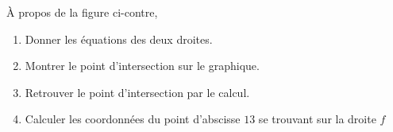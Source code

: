 
\begin{exercice}\label{exosmath-0229}

    \begin{multicols}{2}

        À propos de la figure ci-contre, 
        \begin{enumerate}
            \item
                Donner les équations des deux droites.
            \item
                Montrer le point d'intersection sur le graphique.
            \item
                Retrouver le point d'intersection par le calcul.
            \item
                Calculer les coordonnées du point d'abscisse \( 13\) se trouvant sur la droite \( f\) 
        \end{enumerate}

        \columnbreak

        \begin{center}

        \end{center}

    \end{multicols}
    

\end{exercice}
